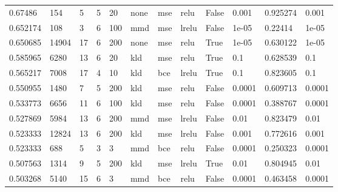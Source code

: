 \begin{longtable}{llllllllllll}
        0.67486 &          154 &              5 &        5 &               20 &        none &                 mse &                relu &     False &   0.001 &  0.925274 &   0.001 \\
       0.652174 &          108 &              3 &        6 &              100 &         mmd &                 mse &               lrelu &     False &   1e-05 &   0.22414 &   1e-05 \\
       0.650685 &        14904 &             17 &        6 &              200 &        none &                 mse &                relu &      True &   1e-05 &  0.630122 &   1e-05 \\
       0.585965 &         6280 &             13 &        6 &               20 &         kld &                 mse &                relu &      True &     0.1 &  0.628539 &     0.1 \\
       0.565217 &         7008 &             17 &        4 &               10 &         kld &                 bce &               lrelu &      True &     0.1 &  0.823605 &     0.1 \\
       0.550955 &         1480 &              7 &        5 &              200 &         kld &                 mse &                relu &     False &  0.0001 &  0.609713 &  0.0001 \\
       0.533773 &         6656 &             11 &        6 &              100 &         kld &                 mse &                relu &     False &  0.0001 &  0.388767 &  0.0001 \\
       0.527869 &         5984 &             13 &        6 &              200 &         mmd &                 mse &               lrelu &     False &    0.01 &  0.823479 &    0.01 \\
       0.523333 &        12824 &             13 &        6 &              200 &         kld &                 mse &               lrelu &     False &   0.001 &  0.772616 &   0.001 \\
       0.523333 &          688 &              5 &        3 &                3 &         mmd &                 bce &                relu &     False &  0.0001 &  0.250323 &  0.0001 \\
       0.507563 &         1314 &              9 &        5 &              200 &         kld &                 mse &               lrelu &      True &    0.01 &  0.804945 &    0.01 \\
       0.503268 &         5140 &             15 &        6 &                3 &         mmd &                 bce &                relu &     False &  0.0001 &  0.463458 &  0.0001 \\

\end{longtable}
